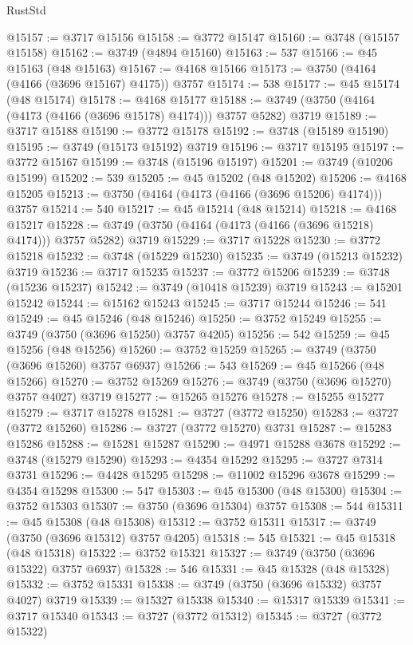 \begin{lexlean}{RustStd}
\begin{coremodule}
@15157 := @3717 @15156
@15158 := @3772 @15147
@15160 := @3748 (@15157 @15158)
@15162 := @3749 (@4894 @15160)
@15163 := 537
@15166 := @45 @15163 (@48 @15163)
@15167 := @4168 @15166
@15173 := @3750 (@4164 (@4166 (@3696 @15167) @4175)) @3757
@15174 := 538
@15177 := @45 @15174 (@48 @15174)
@15178 := @4168 @15177
@15188 := @3749 (@3750 (@4164 (@4173 (@4166 (@3696 @15178) @4174))) @3757 @5282) @3719
@15189 := @3717 @15188
@15190 := @3772 @15178
@15192 := @3748 (@15189 @15190)
@15195 := @3749 (@15173 @15192) @3719
@15196 := @3717 @15195
@15197 := @3772 @15167
@15199 := @3748 (@15196 @15197)
@15201 := @3749 (@10206 @15199)
@15202 := 539
@15205 := @45 @15202 (@48 @15202)
@15206 := @4168 @15205
@15213 := @3750 (@4164 (@4173 (@4166 (@3696 @15206) @4174))) @3757
@15214 := 540
@15217 := @45 @15214 (@48 @15214)
@15218 := @4168 @15217
@15228 := @3749 (@3750 (@4164 (@4173 (@4166 (@3696 @15218) @4174))) @3757 @5282) @3719
@15229 := @3717 @15228
@15230 := @3772 @15218
@15232 := @3748 (@15229 @15230)
@15235 := @3749 (@15213 @15232) @3719
@15236 := @3717 @15235
@15237 := @3772 @15206
@15239 := @3748 (@15236 @15237)
@15242 := @3749 (@10418 @15239) @3719
@15243 := @15201 @15242
@15244 := @15162 @15243
@15245 := @3717 @15244
@15246 := 541
@15249 := @45 @15246 (@48 @15246)
@15250 := @3752 @15249
@15255 := @3749 (@3750 (@3696 @15250) @3757 @4205)
@15256 := 542
@15259 := @45 @15256 (@48 @15256)
@15260 := @3752 @15259
@15265 := @3749 (@3750 (@3696 @15260) @3757 @6937)
@15266 := 543
@15269 := @45 @15266 (@48 @15266)
@15270 := @3752 @15269
@15276 := @3749 (@3750 (@3696 @15270) @3757 @4027) @3719
@15277 := @15265 @15276
@15278 := @15255 @15277
@15279 := @3717 @15278
@15281 := @3727 (@3772 @15250)
@15283 := @3727 (@3772 @15260)
@15286 := @3727 (@3772 @15270) @3731
@15287 := @15283 @15286
@15288 := @15281 @15287
@15290 := @4971 @15288 @3678
@15292 := @3748 (@15279 @15290)
@15293 := @4354 @15292
@15295 := @3727 @7314 @3731
@15296 := @4428 @15295
@15298 := @11002 @15296 @3678
@15299 := @4354 @15298
@15300 := 547
@15303 := @45 @15300 (@48 @15300)
@15304 := @3752 @15303
@15307 := @3750 (@3696 @15304) @3757
@15308 := 544
@15311 := @45 @15308 (@48 @15308)
@15312 := @3752 @15311
@15317 := @3749 (@3750 (@3696 @15312) @3757 @4205)
@15318 := 545
@15321 := @45 @15318 (@48 @15318)
@15322 := @3752 @15321
@15327 := @3749 (@3750 (@3696 @15322) @3757 @6937)
@15328 := 546
@15331 := @45 @15328 (@48 @15328)
@15332 := @3752 @15331
@15338 := @3749 (@3750 (@3696 @15332) @3757 @4027) @3719
@15339 := @15327 @15338
@15340 := @15317 @15339
@15341 := @3717 @15340
@15343 := @3727 (@3772 @15312)
@15345 := @3727 (@3772 @15322)

\end{coremodule}
\end{lexlean}
